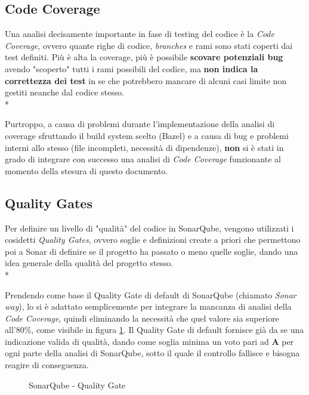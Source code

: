 \documentclass[../main.tex]{subfiles}
\begin{document}
    	    \subsection{Code Coverage}
    	    
    	        Una analisi decisamente importante in fase di testing del codice è la \emph{Code Coverage}, ovvero quante righe di codice, \emph{branches} e rami sono stati coperti dai test definiti. Più è alta la coverage, più è possibile \textbf{scovare potenziali bug} avendo "scoperto" tutti i rami possibili del codice, ma \textbf{non indica la correttezza dei test} in se che potrebbero mancare di alcuni casi limite non gestiti neanche dal codice stesso.\\*
    	        
    	        Purtroppo, a causa di problemi durante l'implementazione della analisi di coverage sfruttando il build system scelto (Bazel) e a causa di bug e problemi interni allo stesso (file incompleti, necessità di dipendenze), \textbf{non} si è stati in grado di integrare con successo una analisi di \emph{Code Coverage} funzionante al momento della stesura di questo documento.
    	
        	\subsection{Quality Gates}
        	
        	    Per definire un livello di "qualità" del codice in SonarQube, vengono utilizzati i cosidetti \emph{Quality Gates}, ovvero soglie e definizioni create a priori che permettono poi a Sonar di definire se il progetto ha passato o meno quelle soglie, dando una idea generale della qualità del progetto stesso.\\*
        	    
        	    Prendendo come base il Quality Gate di default di SonarQube (chiamato \emph{Sonar way}), lo si è adattato semplicemente per integrare la mancanza di analisi della \emph{Code Coverage}, quindi eliminando la necessità che quel valore sia superiore all'80\%, come visibile in figura \ref{fig:sonar_quality_gate}. Il Quality Gate di default fornisce già da se una indicazione valida di qualità, dando come soglia minima un voto pari ad \textbf{A} per ogni parte della analisi di SonarQube, sotto il quale il controllo fallisce e bisogna reagire di conseguenza.
        	    
        	    \begin{figure}[H]
        			\centering
        			\caption{SonarQube - Quality Gate}
        			\label{fig:sonar_quality_gate}
    	        \end{figure}
        	
\end{document}
